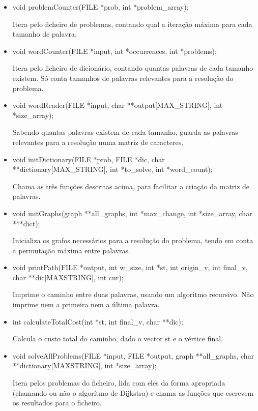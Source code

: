 \documentclass[a4paper, 11pt]{article}
\begin{document}
    \begin{itemize}
    \item void problemCounter(FILE *prob, int *problem{\_}array);
    \par Itera pelo ficheiro de problemas, contando qual a iteração máxima para cada tamanho de palavra.
    
    \item void wordCounter(FILE *input, int *occurrences, int *problems);
    \par Itera pelo ficheiro de dicionário, contando quantas palavras de cada tamanho existem. Só conta tamanhos de palavras relevantes para a resolução do problema.
    
    \item void wordReader(FILE *input, char **output[MAX{\_}STRING], int *size{\_}array);
    \par Sabendo quantas palavras existem de cada tamanho, guarda as palavras relevantes para a resolução numa matriz de caracteres.
    
    \item void initDictionary(FILE *prob, FILE *dic, char **dictionary[MAX{\_}STRING], int *to{\_}solve, int *word{\_}count);
    \par Chama as três funções descritas acima, para facilitar a criação da matriz de palavras.
    
    \item void initGraphs(graph **all{\_}graphs, int *max{\_}change, int *size{\_}array, char ***dict);
    \par Inicializa os grafos necessários para a resolução do problema, tendo em conta a permutação máxima entre palavras.
    
    \item void printPath(FILE *output, int w{\_}size, int *st, int origin{\_}v, int final{\_}v, char **dic[MAX\-{\_}STRING], int cur);
    \par Imprime o caminho entre duas palavras, usando um algorítmo recursivo. Não imprime nem a primeira nem a última palavra.
    
    \item int calculateTotalCost(int *st, int final{\_}v, char **dic);
    \par Calcula o custo total do caminho, dado o vector st e o vértice final.
    
    \item void solveAllProblems(FILE *input, FILE *output, graph **all{\_}graphs, char **dictionary[MAX\-{\_}STRING], int *size{\_}array);
    \par  Itera pelos problemas do ficheiro, lida com eles da forma apropriada (chamando ou não o algorítmo de Dijkstra) e chama as funções que escrevem os resultados para o ficheiro.
    

\end{itemize}
\end{document}
